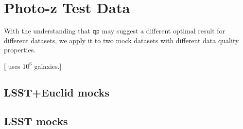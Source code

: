 \documentclass[\docopts]{\docclass}
\begin{document}



\section{Photo-z Test Data}
\label{sec:data}

With the understanding that \texttt{qp} may suggest a different optimal result for different datasets, we apply it to two mock datasets with different data quality properties.

[\citet{carrasco_kind_sparse_2014} uses $10^{6}$ galaxies.]

\subsection{LSST+Euclid mocks}
\label{sec:mg}

\subsection{LSST mocks}
\label{sec:ss}






\end{document}
